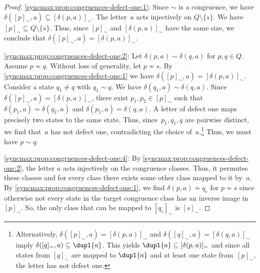 \begin{proof}
	\ref{syncmax:prop:congruences-defect-one:1}: Since $\sim$ is a congruence, we have 
	$\delta([p]_{\sim}, a) \subseteq [\delta(p, a)]_{\sim}$.
	The letter~$a$ acts injectively on $Q \setminus \{s\}$.
	We have $[p]_{\sim} \subseteq Q \setminus \{s\}$.
	Thus, since $[p]_{\sim}$ and $[\delta(p, a)]_{\sim}$ have the same size,
	we conclude that $\delta([p]_{\sim}, a) = [\delta(p, a)]_{\sim}$.
	
	\ref{syncmax:prop:congruences-defect-one:2}: Let $\delta(p, a) \sim \delta(q, a)$ for $p,q \in Q$.
	Assume $p \not\sim q$. Without loss of generality, let $p \not\sim s$.
	By \cref{syncmax:prop:congruences-defect-one:1} 
	we have $\delta([p]_{\sim}, a) = [\delta(p, a)]_{\sim}$.
	Consider a state $q_1 \ne q$ with $q_1 \sim q$.
	We have $\delta(q_1, a) \sim \delta(q, a)$.
	Since $\delta([p]_{\sim}, a) = [\delta(p, a)]_{\sim}$,
	there exist $p_1, p_2 \in [p]_{\sim}$ such that $\delta(p_1, a) = \delta(q_1, a)$
	and $\delta(p_1, a) = \delta(q, a)$.
	A letter of defect one maps precisely two states to the same state.
	Thus, since~$p_1, q_1, q$ are pairwise distinct,
	we find that~$a$ has not defect one, contradicting the choice of~$a$.\footnote{Alternatively, 
		$\delta([p]_{\sim}, a) = [\delta(p, a)]_{\sim}$
		and $\delta([q]_{\sim}, a) = [\delta(q, a)]_{\sim}$
		imply $\delta([q]_{\sim}, a) \subseteq \dupl{a}$.
		This yields $\dupl{a} \subseteq [\delta(p, a)]_{\sim}$
		and since all states from $[q]_{\sim}$ are mapped to $\dupl{a}$
		and at least one state from~$[p]_{\sim}$,
		the letter has not defect one.}
	Thus, we must have $p \sim q$.
	
	
	\ref{syncmax:prop:congruences-defect-one:4}: 		
	By \cref{syncmax:prop:congruences-defect-one:2}, the letter $a$ acts injectively on the congruence classes.
	Thus, it permutes these classes and for every class there exists some other class
	mapped to it by~$a$.
	By \cref{syncmax:prop:congruences-defect-one:1}, we find $\delta(p, a) \not\sim q_e$ for $p \not\sim s$
	since otherwise not every state in the target congruence class has an
	inverse image in $[p]_{\sim}$.
	So, the only class that can be mapped to $[q_e]_{\sim}$
	is $[s]_{\sim}$.
	
\end{proof}

